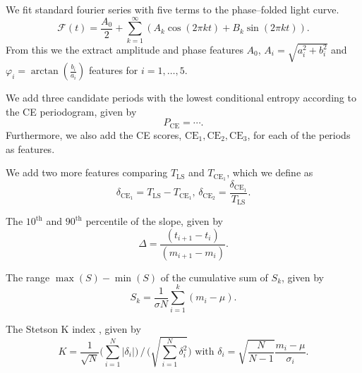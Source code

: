 \begin{enumerate}
 We fit standard fourier series with five terms to the phase--folded light curve.
\begin{equation}\mathcal{F}(t) = \frac{A_0}{2} + \sum_{k=1}^{\infty} ( A_k \cos(2 \pi k t) + B_k \sin(2 \pi k t) ).\end{equation}
From this we the extract amplitude and phase features $A_0$, $A_i = \sqrt{a_i^2 + b_i^2}$ and $\varphi_i = \arctan(\frac{b_i}{a_i})$ features for $i = 1, \ldots, 5$.

 We add three candidate periods with the lowest conditional entropy according to the CE periodogram, given by
\begin{equation}P_{\text{CE}} = \cdots.\end{equation}
Furthermore, we also add the CE scores, $\text{CE}_1, \text{CE}_2, \text{CE}_3$, for each of the periods as features.

 We add two more features comparing $T_{\text{LS}}$ and $T_{\text{CE}_1}$, which we define as
\begin{equation}\delta_{\text{CE}_1} = T_{\text{LS}} - T_{\text{CE}_1}, \, \delta_{\text{CE}_2} = \frac{\delta_{\text{CE}_1}}{T_{\text{LS}}}.\end{equation}

 The $10^\text{th}$ and $90^\text{th}$ percentile of the slope, given by
\begin{equation}\Delta = \frac{(t_{i+1} - t_i)}{(m_{i+1} - m_i)}.\end{equation}

 The range $\max(S) - \min(S)$ of the cumulative sum \citep{ellaway1978} of $S_k$, given by
\begin{equation}S_k = \frac{1}{\sigma N} \sum\limits_{i=1}^k (m_i - \mu) .\end{equation}

 The Stetson K index \citep{stetson1996}, given by
\begin{equation}K = \frac{1}{\sqrt{N}} \big( \sum\limits_{i=1}^N |\delta_i| \big) \, / \, \big( \sqrt{\sum\limits_{i=1}^N \delta_i^2} \big) \text{ with } \delta_i = \sqrt{\frac{N}{N-1}} \frac{m_i - \mu}{\sigma_i}.\end{equation}


\end{enumerate}

